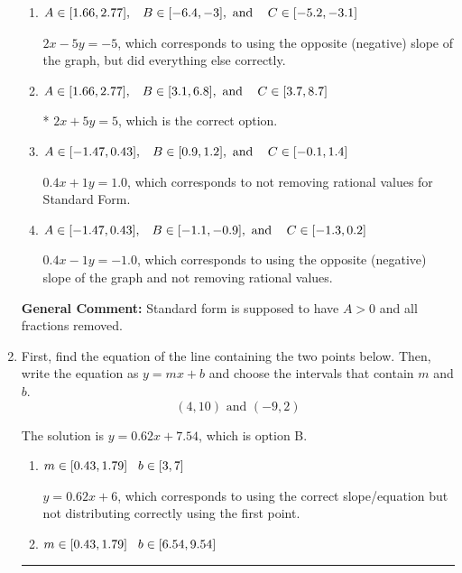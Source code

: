 \documentclass{extbook}[14pt]
\newcommand{\litem}[1]{\item #1

\rule{\textwidth}{0.4pt}}
\begin{document}
\begin{enumerate}
{\begin{enumerate}[label=\Alph*.]
 $-2x - 5y = -5$, which corresponds to not making $A$ positive (by multiplying the equation by $-1$).
\item \( A \in [1.66, 2.77], \hspace{3mm} B \in [-6.4, -3], \text{ and } \hspace{3mm} C \in [-5.2, -3.1] \)

 $2x - 5y = -5$, which corresponds to using the opposite (negative) slope of the graph, but did everything else correctly.
\item \( A \in [1.66, 2.77], \hspace{3mm} B \in [3.1, 6.8], \text{ and } \hspace{3mm} C \in [3.7, 8.7] \)

* $2x + 5y = 5$, which is the correct option.
\item \( A \in [-1.47, 0.43], \hspace{3mm} B \in [0.9, 1.2], \text{ and } \hspace{3mm} C \in [-0.1, 1.4] \)

 $0.4x + 1y = 1.0$, which corresponds to not removing rational values for Standard Form.
\item \( A \in [-1.47, 0.43], \hspace{3mm} B \in [-1.1, -0.9], \text{ and } \hspace{3mm} C \in [-1.3, 0.2] \)

 $0.4x - 1y = -1.0$, which corresponds to using the opposite (negative) slope of the graph and not removing rational values.
\end{enumerate}

\textbf{General Comment:} Standard form is supposed to have $A > 0$ and all fractions removed.
}
\litem{
First, find the equation of the line containing the two points below. Then, write the equation as $ y=mx+b $ and choose the intervals that contain $m$ and $b$.
\[ (4, 10) \text{ and } (-9, 2) \]

The solution is \( y = 0.62x + 7.54 \), which is option B.\begin{enumerate}[label=\Alph*.]
\item \( m \in [0.43, 1.79] \hspace*{3mm} b \in [3, 7] \)

 $y = 0.62x + 6$, which corresponds to using the correct slope/equation but not distributing correctly using the first point.
\item \( m \in [0.43, 1.79] \hspace*{3mm} b \in [6.54, 9.54] \)


\end{enumerate}}
\end{enumerate}
\end{document}
